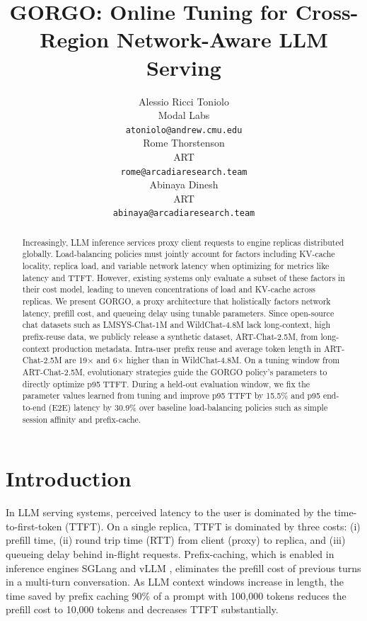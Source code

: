\documentclass{article}
\title{GORGO: Online Tuning for Cross-Region Network-Aware LLM Serving}
\author{
  Alessio Ricci Toniolo \\
  Modal Labs \\
  \texttt{atoniolo@andrew.cmu.edu} \\
  \And
  Rome Thorstenson \\
  ART \\
  \texttt{rome@arcadiaresearch.team} \\
  \And
  Abinaya Dinesh \\
  ART \\
  \texttt{abinaya@arcadiaresearch.team} \\
}
\begin{document}
\maketitle

\begin{abstract}
Increasingly, LLM inference services proxy client requests to engine replicas distributed globally.
Load-balancing policies must jointly account for
factors including KV-cache locality, replica load, and variable network latency when
optimizing for metrics like latency and TTFT.
However, existing systems only evaluate a subset of these factors in their cost
model, leading to uneven concentrations of load and KV-cache across replicas. We
present GORGO, a proxy architecture that holistically factors network latency,
prefill cost, and queueing delay using tunable parameters. Since open-source chat
datasets such as LMSYS-Chat-1M and WildChat-4.8M lack long-context, high
prefix-reuse data, we publicly release a synthetic dataset, ART-Chat-2.5M, from
long-context production metadata. Intra-user prefix reuse and average token
length in ART-Chat-2.5M are 19$\times$ and 6$\times$ higher than in WildChat-4.8M. On a tuning window from ART-Chat-2.5M,
evolutionary strategies guide the GORGO policy's parameters to directly optimize
p95 TTFT. During a held-out evaluation window, we fix the parameter values learned
from tuning and improve p95 TTFT by 15.5\% and p95 end-to-end (E2E) latency by
30.9\% over baseline load-balancing policies such as simple session affinity
and prefix-cache.
\end{abstract}

\section{Introduction}
\label{sec:intro}

In LLM serving systems, perceived latency to the user is dominated by the time-to-first-token (TTFT). On a single replica, TTFT is dominated by three costs: (i) prefill time, (ii) round trip time (RTT) from client (proxy) to replica, and (iii) queueing delay behind in-flight requests. Prefix-caching, which is enabled in inference engines SGLang \citep{sglang2024} and vLLM \citep{vllm2023}, eliminates the prefill cost of previous turns in a multi-turn conversation. As LLM context windows increase in length, the time saved by prefix caching 90\% of a prompt with 100,000 tokens reduces the prefill cost to 10,000 tokens and decreases TTFT substantially.
\end{document}
